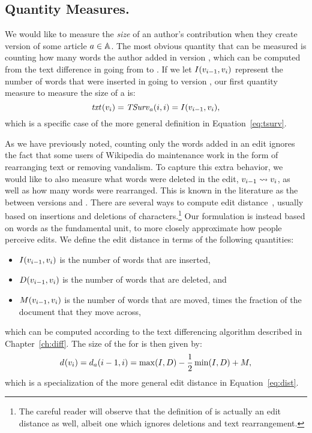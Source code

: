 \subsection{Quantity Measures.}

We would like to measure the \textit{size} of an author's contribution
when they create version  of some article $a \in \mathbb{A}$.
The most obvious quantity that can be measured is counting how
many words the author added in version ,
which can be computed from the text difference in going from
 to .
If we let $I(v_{i-1}, v_{i})$ represent the number
of words that were inserted in going to version ,
our first quantity measure to measure the size of a
 is:
\begin{equation*}
\mathit{txt}_{}(v_{i}) = \mathit{TSurv}_{a}(i,i) = I(v_{i-1},v_{i}),
\end{equation*}
which is a specific case of the more general
definition in Equation~\ref{eq:tsurv}.


As we have previously noted, counting only the words added in
an edit ignores the fact that some users of Wikipedia do maintenance
work in the form of rearranging text or removing vandalism.
To capture this extra behavior, we would like to also measure
what words were deleted in the edit, $v_{i-1} \rightsquigarrow v_{i}$,
as well as how many words were rearranged.
This is known in the literature as the  between
versions  and .
There are several ways to compute edit
distance~\cite{Levenshtein1966,Tichy1984},
usually based on insertions and deletions of
characters.\footnote{The careful reader will observe that
the definition of  is actually an
edit distance as well, albeit one which ignores deletions
and text rearrangement.}
Our formulation is instead based on words as the fundamental unit,
to more closely approximate how people perceive edits.
We define the edit distance in terms of the following quantities:
\begin{itemize}
\item $I(v_{i-1}, v_{i})$ is the number of words that are inserted,
\item $D(v_{i-1}, v_{i})$ is the number of words that are deleted,
    and
\item $M(v_{i-1}, v_{i})$ is the number of words that are moved,
    times the fraction of the document that they move across,
\end{itemize}
which can be computed according to the text differencing
algorithm described in Chapter~\ref{ch:diff}.
The size of the  for  is
then given by:
%
\begin{equation*}
d_{}(v_{i}) = d_{a}(i-1,i) = \max(I, D)
    - \frac{1}{2}\min(I, D) + M,
\end{equation*}
which is a specialization of the more general
edit distance in Equation~\ref{eq:dist}.



